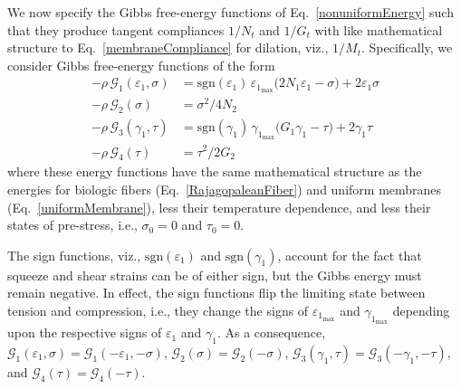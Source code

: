 We now specify the Gibbs free-energy functions of Eq.~\ref{nonuniformEnergy} such that they produce tangent compliances $1/N_t$ and $1/G_t$ with like mathematical structure to Eq.~\ref{membraneCompliance} for dilation, viz., $1/M_t$. Specifically, we consider Gibbs free-energy functions of the form
\begin{subequations}
    \label{nonuniformComplianceEnergies}
    \begin{align}
    -\rho \, \mathcal{G}_1 ( \varepsilon_1 , \sigma ) & = \mathrm{sgn} ( \varepsilon_1 ) \, \varepsilon_{1_{\max}} \bigl( 2 N_1 \varepsilon_1 - \sigma \bigr) + 2 \varepsilon_1 \sigma
    \label{squeezeImplicitEnergy} \\
    -\rho \, \mathcal{G}_2 ( \sigma ) & = \sigma^2 / 4 N_2
    \label{squeezeExplicitEnergy} \\
    -\rho \, \mathcal{G}_3 ( \gamma_1 , \tau ) & = \mathrm{sgn} ( \gamma_1 ) \, \gamma_{1_{\max}} \bigl( G_1 \gamma_1 - \tau \bigr) + 2 \gamma_1 \tau 
    \label{shearImplicitEnergy} \\
    -\rho \, \mathcal{G}_4 ( \tau ) & = \tau^2 / 2 G_2 
    \label{shearExplicitEnergy}
    \end{align}
\end{subequations}
where these energy functions have the same mathematical structure as the energies for biologic fibers (Eq.~\ref{RajagopaleanFiber}) and uniform membranes (Eq.~\ref{uniformMembrane}), less their temperature dependence, and less their states of pre-stress, i.e., $\sigma_0 = 0$ and $\tau_0 = 0$.  

The sign functions, viz., $\mathrm{sgn}( \varepsilon_1 )$ and $\mathrm{sgn} ( \gamma_1 )$, account for the fact that squeeze and shear strains can be of either sign, but the Gibbs energy must remain negative.  In effect, the sign functions flip the limiting state between tension and compression, i.e., they change the signs of $\varepsilon_{1_{\max}}$ and $\gamma_{1_{\max}}$ depending upon the respective signs of $\varepsilon_1$ and $\gamma_1$. As a consequence, $\mathcal{G}_1 (\varepsilon_1 , \sigma) = \mathcal{G}_1 (-\varepsilon_1 , -\sigma)$, $\mathcal{G}_2 (\sigma) = \mathcal{G}_2 (-\sigma)$, $\mathcal{G}_3 (\gamma_1 , \tau) = \mathcal{G}_3 (-\gamma_1 , -\tau)$, and $\mathcal{G}_4 (\tau) = \mathcal{G}_4 (-\tau)$.  

